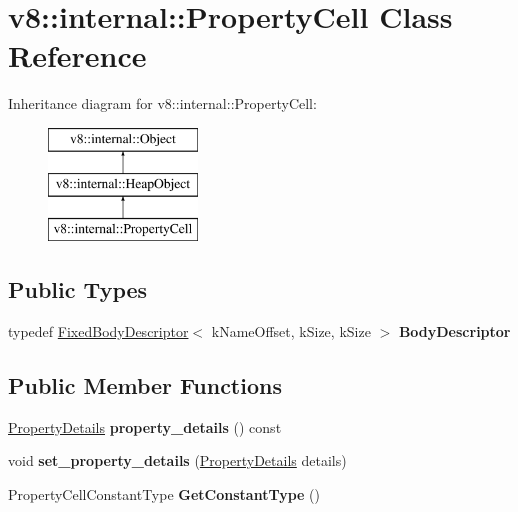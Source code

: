 \hypertarget{classv8_1_1internal_1_1PropertyCell}{}\section{v8\+:\+:internal\+:\+:Property\+Cell Class Reference}
\label{classv8_1_1internal_1_1PropertyCell}
Inheritance diagram for v8\+:\+:internal\+:\+:Property\+Cell\+:\begin{figure}[H]
\begin{center}
\leavevmode
\includegraphics[height=3.000000cm]{classv8_1_1internal_1_1PropertyCell}
\end{center}
\end{figure}
\subsection*{Public Types}
\begin{DoxyCompactItemize}
\item 
\mbox{\label{classv8_1_1internal_1_1PropertyCell_aeb393fc6731d117c3ffe49529ffef01c}} 
typedef \mbox{\hyperlink{classv8_1_1internal_1_1FixedBodyDescriptor}{Fixed\+Body\+Descriptor}}$<$ k\+Name\+Offset, k\+Size, k\+Size $>$ {\bfseries Body\+Descriptor}
\end{DoxyCompactItemize}
\subsection*{Public Member Functions}
\begin{DoxyCompactItemize}
\item 
\mbox{\label{classv8_1_1internal_1_1PropertyCell_a18ce56f3c916f221defd2c721acf3ead}} 
\mbox{\hyperlink{classv8_1_1internal_1_1PropertyDetails}{Property\+Details}} {\bfseries property\+\_\+details} () const
\item 
\mbox{\label{classv8_1_1internal_1_1PropertyCell_a937742725ab442a47662f39d0acccb05}} 
void {\bfseries set\+\_\+property\+\_\+details} (\mbox{\hyperlink{classv8_1_1internal_1_1PropertyDetails}{Property\+Details}} details)
\item 
\mbox{\label{classv8_1_1internal_1_1PropertyCell_ad575b8b56625ef4ce299f936c1396734}} 
Property\+Cell\+Constant\+Type {\bfseries Get\+Constant\+Type} ()
\end{DoxyCompactItemize}
